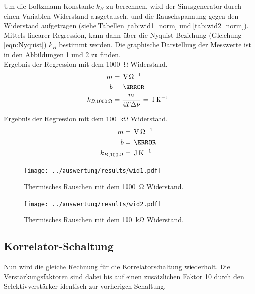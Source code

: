 Um die Boltzmann-Konstante $k_B$ zu berechnen, wird der Sinusgenerator durch einen Variablen Widerstand ausgetauscht und die Rauschspannung gegen den Widerstand aufgetragen (siehe Tabellen \ref{tab:wid1_norm} und \ref{tab:wid2_norm}). Mittels linearer Regression, kann dann über die Nyquist-Beziehung (Gleichung \ref{eqn:Nyquist}) $k_B$ bestimmt werden. Die graphische Darstellung der Messwerte ist in den Abbildungen \ref{fig:thermRauschen1} und \ref{fig:thermRauschen2} zu finden.\\

Ergebnis der Regression mit dem \SI{1000}{\ohm} Widerstand.
\begin{align*}
	m &= \,\si{\volt\per\ohm}\\
	b &= \,\volt\\
	k_{B,1000\,\Omega} &= \frac{m}{4T\Delta\nu} =\,\si{\joule\per\kelvin}\\
\end{align*}

Ergebnis der Regression mit dem \SI{100}{\kilo\ohm} Widerstand.
\begin{align*}
m &= \,\si{\volt\per\ohm}\\
b &= \,\volt\\
k_{B,100\,\Omega} &= \,\si{\joule\per\kelvin}
\end{align*}

\begin{figure}[H]
	\texttt{[image: ../auswertung/results/wid1.pdf]}
	\caption{Thermisches Rauschen mit dem \SI{1000}{\ohm} Widerstand.}
	\label{fig:thermRauschen1}
\end{figure}

\begin{figure}[H]
	\texttt{[image: ../auswertung/results/wid2.pdf]}
	\caption{Thermisches Rauschen mit dem \SI{100}{\kilo\ohm} Widerstand.}
	\label{fig:thermRauschen2}
\end{figure}


\subsection{Korrelator-Schaltung}
Nun wird die gleiche Rechnung für die Korrelatorschaltung wiederholt. Die Verstärkungsfaktoren sind dabei bis auf einen zusätzlichen Faktor 10 durch den Selektivverstärker identisch zur vorherigen Schaltung.

